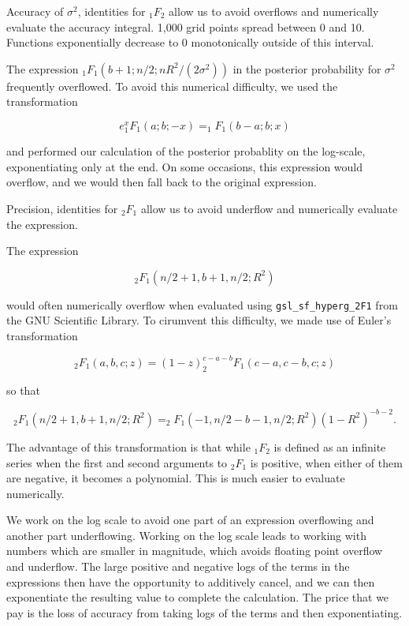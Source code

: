 \documentclass{amsart}[12pt]
\newcommand{\mgc}[1]{{\color{blue}#1}}
\begin{document}
\mgc{Accuracy of $\sigma^2$, identities for $_1 F_2$ allow us to avoid overflows and numerically evaluate the
accuracy integral. 1,000 grid points spread between 0 and 10. Functions exponentially decrease to 0
monotonically outside of this interval.
}

The expression $_1 F_1\left (b + 1; n/2; nR^2/(2 \sigma^2) \right)$ in the posterior
probability for $\sigma^2$ frequently overflowed. To avoid this numerical difficulty, we used the transformation

\[
	e^x _1 F_1(a; b; -x) = _1 F_1(b - a; b; x)
\]

and performed our calculation of the posterior probablity on the log-scale, exponentiating only at the end.
On some occasions, this expression would overflow, and we would then fall back to the original expression.

\mgc{
Precision, identities for $_2 F_1$ allow us to avoid underflow and numerically evaluate the expression.
}

The expression

\[
	_2 F_1(n/2 + 1, b + 1, n/2; R^2)
\]

would often numerically overflow when evaluated using \texttt{gsl\_sf\_hyperg\_2F1} from the GNU Scientific
Library. To cirumvent this difficulty, we made use of Euler's transformation

\[
	_2 F_1(a, b, c; z) = (1 - z)^{c - a - b} _2 F_1 (c - a, c - b, c; z)
\]

so that

\[
	_2 F_1(n/2 + 1, b + 1, n/2; R^2) = _2 F_1(-1, n/2 - b - 1, n/2; R^2) (1 - R^2)^{-b-2}.
\]

The advantage of this transformation is that while $_1 F_2$ is defined as an infinite series when the first
and second arguments to $_2 F_1$ is positive, when either of them are negative, it becomes a polynomial. This
is much easier to evaluate numerically.

We work on the log scale to avoid one part of an expression overflowing and another part underflowing. Working
on the log scale leads to working with numbers which are smaller in magnitude, which avoids floating point
overflow and underflow. The large positive and negative logs of the terms in the expressions then have the
opportunity to additively cancel, and we can then exponentiate the resulting value to complete the
calculation. The price that we pay is the loss of accuracy from taking logs of the terms and then
exponentiating.



\end{document}
